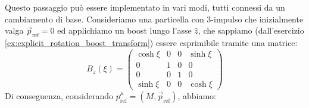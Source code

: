 \documentclass[../main.tex]{subfiles}
\begin{document}
Questo passaggio può essere implementato in vari modi, tutti connessi da un cambiamento di base.
Consideriamo una particella con 3-impulso che inizialmente valga \(\Vec p_\text{ref} = 0\) ed applichiamo un boost lungo l'asse $\hat{z}$, che sappiamo (dall'esercizio \ref{ex:explicit_rotation_boost_transform}) essere esprimibile tramite una matrice:
\[
B_z(\xi) =
\begin{pmatrix}
    \cosh\xi   &   0   &   0   &   \sinh\xi\\
    0   &   1   &   0   &   0\\
    0   &   0   &   1   &   0\\
    \sinh\xi   &   0   &   0   &   \cosh\xi
\end{pmatrix}
\]
Di conseguenza, considerando \(p^\mu_\text{ref} = (M, \Vec p_\text{ref})\), abbiamo:
\end{document}
